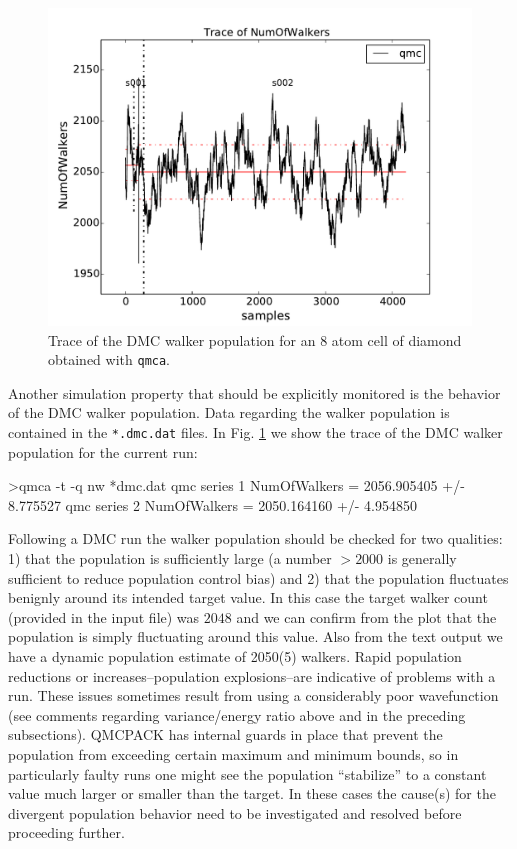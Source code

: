 \begin{figure}
\begin{center}
\includegraphics[trim = 0mm 0mm 0mm 0mm, clip,width=0.75\columnwidth]{figures/qmca_pop_trace.pdf}
\end{center}
\caption{Trace of the DMC walker population for an 8 atom cell of diamond obtained with \texttt{qmca}.  
\label{fig:qmca_pop_trace}
}
\end{figure}

Another simulation property that should be explicitly monitored  
is the behavior of the DMC walker population.  Data regarding the 
walker population is contained in the \texttt{*.dmc.dat} files.
In Fig. \ref{fig:qmca_pop_trace} we show the trace of the DMC 
walker population for the current run:
\begin{shade}
>qmca -t -q nw *dmc.dat
qmc  series 1  NumOfWalkers          =  2056.905405 +/- 8.775527 
qmc  series 2  NumOfWalkers          =  2050.164160 +/- 4.954850 
\end{shade}
\noindent
Following a DMC run the walker population should be checked for 
two qualities: 1) that the population is sufficiently large (a number 
$>2000$ is generally sufficient to reduce population control bias) and  
2) that the population fluctuates benignly around its intended target 
value. In this case the target walker count (provided in the input file)
was $2048$ and we can confirm from the plot that the population is simply 
fluctuating around this value.  Also from the text output we have a dynamic 
population estimate of 2050(5) walkers.  Rapid population reductions or 
increases--population explosions--are indicative of problems with a run.  
These issues sometimes result from using a considerably poor wavefunction 
(see comments regarding variance/energy ratio above and in the preceding 
subsections).  QMCPACK has internal guards in place that prevent 
the population from exceeding certain maximum and minimum bounds, so 
in particularly faulty runs one might see the population ``stabilize'' 
to a constant value much larger or smaller than the target.  In these 
cases the cause(s) for the divergent population behavior need to 
be investigated and resolved before proceeding further.



